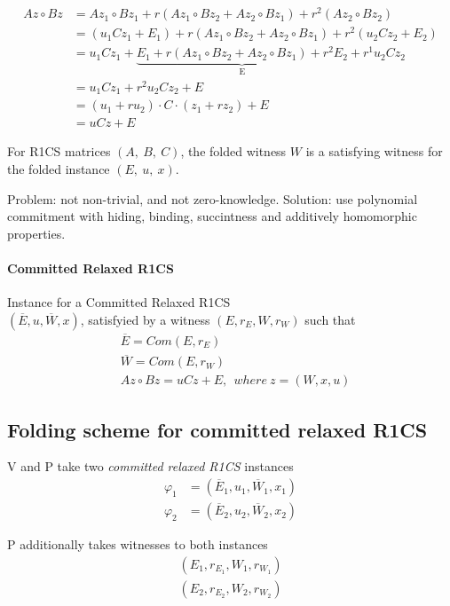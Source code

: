 \documentclass{article}
\theoremstyle{definition}
\begin{document}
\begin{align*}
	Az \circ Bz &= A z_1 \circ B z_1 + r(A z_1 \circ B z_2 + A z_2 \circ B z_1) + r^2 (A z_2 \circ B z_2)\\
		    &= (u_1 C z_1 + E_1) + r (A z_1 \circ B z_2 + A z_2 \circ B z_1) + r^2 (u_2 C z_2 + E_2)\\
		    &= u_1 C z_1 + \underbrace{E_1 + r(A z_1 \circ B z_2 + A z_2 \circ B z_1) + r^2 E_2}_\text{E} + r^1 u_2 C z_2\\
		    &= u_1 C z_1 + r^2 u_2 C z_2 + E\\
		    &= (u_1 + r u_2) \cdot C \cdot (z_1 + r z_2) + E\\
		    &= uCz + E
\end{align*}

For R1CS matrices $(A,~B,~C)$, the folded witness $W$ is a satisfying witness for the folded instance $(E,~u,~x)$.



\vspace{20px}
Problem: not non-trivial, and not zero-knowledge. Solution: use polynomial commitment with hiding, binding, succintness and additively homomorphic properties.

\paragraph{Committed Relaxed R1CS}
Instance for a Committed Relaxed R1CS\\
$(\overline{E}, u, \overline{W}, x)$, satisfyied by a witness $(E, r_E, W, r_W)$ such that
\begin{align*}
	&\overline{E} = Com(E, r_E)\\
	&\overline{W} = Com(E, r_W)\\
	&Az \circ Bz = uCz+E,~~ where~z=(W, x, u)
\end{align*}


\subsection{Folding scheme for committed relaxed R1CS}

V and P take two \emph{committed relaxed R1CS} instances
\begin{align*}
	\varphi_1&=(\overline{E}_1, u_1, \overline{W}_1, x_1)\\
	\varphi_2&=(\overline{E}_2, u_2, \overline{W}_2, x_2)
\end{align*}

P additionally takes witnesses to both instances
\begin{align*}
	(E_1, r_{E_1}, W_1, r_{W_1})\\
	(E_2, r_{E_2}, W_2, r_{W_2})
\end{align*}
\end{document}
